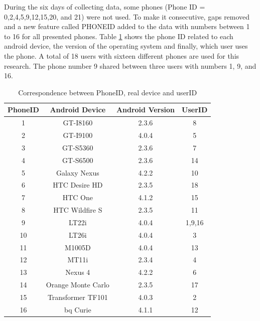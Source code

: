 During the six days of collecting data, some phones (Phone ID = 0,2,4,5,9,12,15,20, and 21) were not used. To make it consecutive, gaps removed and a new feature called PHONEID added to the data with numbers between 1 to 16 for all presented phones.
Table \ref{phone} shows the phone ID related to each android device, the version of the operating system and finally, which user uses the phone. A total of 18 users with sixteen different phones are used for this research. The phone number 9 shared between three users with numbers 1, 9, and 16.




 

\begin{table}[!ht]
    \centering
    \caption{ Correspondence between PhoneID, real device and userID }
    \label{phone}
    \begin{tabular}{c c c c}
    \hline
     \textbf{PhoneID} & \textbf{Android Device}  & \textbf{Android Version} & \textbf{UserID} \\
     \hline\midrule
      1 & GT-I8160   & 2.3.6 &8\\
     \hline
      2 & GT-I9100   & 4.0.4 &5\\
     \hline
      3 & GT-S5360  &2.3.6  & 7\\
     \hline
      4 & GT-S6500  &2.3.6  &14\\
     \hline
      5 &  Galaxy Nexus  & 4.2.2  &10\\
      \hline
      6  & HTC Desire HD  &2.3.5 &18\\
     \hline
      7  & HTC One  & 4.1.2  & 15\\
     \hline
      8 &  HTC Wildfire S &2.3.5  &11 \\
     \hline
      9 &  LT22i  & 4.0.4  &1,9,16\\
     \hline
      10 &  LT26i  & 4.0.4  &3\\
      \hline      
      11 &  M1005D  & 4.0.4  &13\\
      \hline
      12 &  MT11i  & 2.3.4  &4\\
      \hline      
      13 &  Nexus 4 & 4.2.2  &6\\
      \hline     
      14 &  Orange Monte Carlo  & 2.3.5  &17\\
      \hline      
      15 &  Transformer TF101  & 4.0.3  &2\\
      \hline
      16 & bq Curie   &  4.1.1 & 12\\
      \hline\midrule
    \end{tabular}
    
\end{table}





